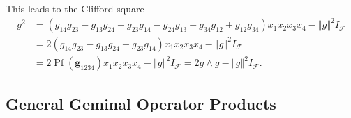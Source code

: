 \documentclass[aps,preprint]{revtex4}%
\begin{document}
This leads to the Clifford square
\begin{align}
g^{2}  &  =\left(  \mathit{g}_{14}\mathit{g}_{23}-\mathit{g}_{13}%
\mathit{g}_{24}+\mathit{g}_{23}\mathit{g}_{14}-\mathit{g}_{24}\mathit{g}%
_{13}+\mathit{g}_{34}\mathit{g}_{12}+\mathit{g}_{12}\mathit{g}_{34}\right)
x_{1}x_{2}x_{3}x_{4}-\left\Vert \mathit{g}\right\Vert ^{2}I_{\mathcal{F}}\\
&  =2\left(  \mathit{g}_{14}\mathit{g}_{23}-\mathit{g}_{13}\mathit{g}%
_{24}+\mathit{g}_{23}\mathit{g}_{14}\right)  x_{1}x_{2}x_{3}x_{4}-\left\Vert
\mathit{g}\right\Vert ^{2}I_{\mathcal{F}}\\
&  =2\operatorname*{Pf}\left(  \mathbf{g}_{1234}\right)  x_{1}x_{2}x_{3}%
x_{4}-\left\Vert \mathit{g}\right\Vert ^{2}I_{\mathcal{F}}=2g\wedge
g-\left\Vert \mathit{g}\right\Vert ^{2}I_{\mathcal{F}}.
\end{align}


\subsection{General Geminal Operator Products}
\end{document}
